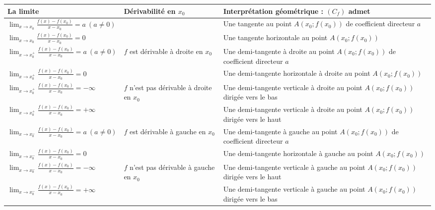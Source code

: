 \documentclass{article}
\begin{document}
\begin{table}[h!]
\centering
\renewcommand{\arraystretch}{1.2} %
\scriptsize %
\begin{tabular}{|>{\centering\arraybackslash}m{4cm}|>{\centering\arraybackslash}m{2.5cm}|>{\centering\arraybackslash}m{5cm}|}
\hline
\textbf{La limite} & \textbf{Dérivabilité en \( x_0 \)} & \textbf{Interprétation géométrique : \( (C_f) \) admet} \\
\hline
\(\lim_{x \to x_0} \frac{f(x) - f(x_0)}{x - x_0} = a \ (a \neq 0)\) & \multirow{2}{*}{\(f\) est dérivable en \(x_0\)} & Une tangente au point \( A \left(x_0; f(x_0)\right) \) de coefficient directeur \(a\) \\
\cline{1-1} \cline{3-3}
\(\lim_{x \to x_0} \frac{f(x) - f(x_0)}{x - x_0} = 0 \) &  & Une tangente horizontale au point \( A \left(x_0; f(x_0)\right) \) \\
\hline
\(\lim_{x \to x_0^+} \frac{f(x) - f(x_0)}{x - x_0} = a \ (a \neq 0) \) & \(f\) est dérivable à droite en \(x_0\) & Une demi-tangente à droite au point \( A \left(x_0; f(x_0)\right) \) de coefficient directeur \(a\) \\
\cline{1-1} \cline{3-3} 
\(\lim_{x \to x_0^+} \frac{f(x) - f(x_0)}{x - x_0} = 0 \) &  & Une demi-tangente horizontale à droite au point \( A \left(x_0; f(x_0)\right) \) \\
\hline
\(\lim_{x \to x_0^+} \frac{f(x) - f(x_0)}{x - x_0} = -\infty \) & \(f\) n'est pas dérivable à droite en \(x_0\) & Une demi-tangente verticale à droite au point \( A \left(x_0; f(x_0)\right) \) dirigée vers le bas \\
\cline{1-1} \cline{3-3}
\(\lim_{x \to x_0^+} \frac{f(x) - f(x_0)}{x - x_0} = +\infty \) &  & Une demi-tangente verticale à droite au point \( A \left(x_0; f(x_0)\right) \) dirigée vers le haut \\
\hline
\(\lim_{x \to x_0^-} \frac{f(x) - f(x_0)}{x - x_0} = a \ (a \neq 0) \) & \(f\) est dérivable à gauche en \(x_0\) & Une demi-tangente à gauche au point \( A \left(x_0; f(x_0)\right) \) de coefficient directeur \(a\) \\
\cline{1-1} \cline{3-3}
\(\lim_{x \to x_0^-} \frac{f(x) - f(x_0)}{x - x_0} = 0 \) &  & Une demi-tangente horizontale à gauche au point \( A \left(x_0; f(x_0)\right) \) \\
\hline
\(\lim_{x \to x_0^-} \frac{f(x) - f(x_0)}{x - x_0} = -\infty \) & \(f\) n'est pas dérivable à gauche en \(x_0\) & Une demi-tangente verticale à gauche au point \( A \left(x_0; f(x_0)\right) \) dirigée vers le haut \\
\cline{1-1} \cline{3-3}
\(\lim_{x \to x_0^-} \frac{f(x) - f(x_0)}{x - x_0} = +\infty \) &  & Une demi-tangente verticale à gauche au point \( A \left(x_0; f(x_0)\right) \) dirigée vers le bas \\
\hline
\end{tabular}
\end{table}
\end{document}
